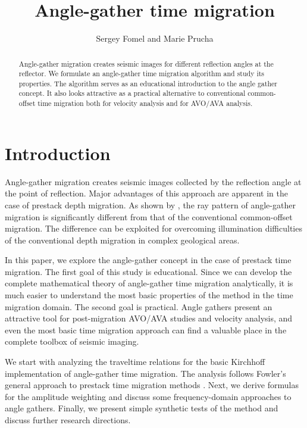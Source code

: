 



\title{Angle-gather time migration}


\author{Sergey Fomel and Marie Prucha}
\maketitle

\begin{abstract} 
Angle-gather migration creates seismic images for different
  reflection angles at the reflector. We formulate an angle-gather
  time migration algorithm and study its properties. The algorithm
  serves as an educational introduction to the angle gather concept.
  It also looks attractive as a practical alternative to conventional
  common-offset time migration both for velocity analysis and for
  AVO/AVA analysis.
\end{abstract}

\section{Introduction}

Angle-gather migration creates seismic images collected by the
reflection angle at the point of reflection. Major advantages of this
approach are apparent in the case of prestack depth migration. As
shown by , the ray 
pattern of angle-gather migration is significantly different from that
of the conventional common-offset migration. The difference can be
exploited for overcoming illumination difficulties of the conventional
depth migration in complex geological areas.
\par
In this paper, we explore the angle-gather concept in the case of
prestack time migration. The first goal of this study is educational.
Since we can develop the complete mathematical theory of angle-gather
time migration analytically, it is much easier to understand the most
basic properties of the method in the time migration domain. The
second goal is practical. Angle gathers present an attractive tool for
post-migration AVO/AVA studies and velocity analysis, and even the
most basic time migration approach can find a valuable place in the
complete toolbox of seismic imaging.
\par
We start with analyzing the traveltime relations for the basic
Kirchhoff implementation of angle-gather time migration. The analysis
follows Fowler's general approach to prestack time migration methods
\cite{fowler}. Next, we derive formulas for the amplitude weighting
and discuss some frequency-domain approaches to angle gathers.
Finally, we present simple synthetic tests of the method and discuss
further research directions.

